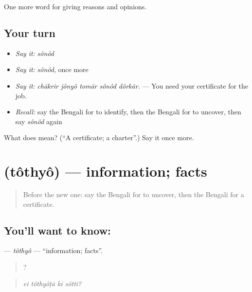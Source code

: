 \begin{grammarlens}[title={What you've built}]
One more word for giving reasons and opinions.
\end{grammarlens}

\subsection*{Your turn}
\begin{itemize}
\raggedright
  \item \emph{Say it:} \emph{sônôd}
  \item \emph{Say it:} \emph{sônôd}, once more
  \item \emph{Say it:} \emph{chākrir jônyô tomār sônôd dôrkār.} — You need your certificate for the job.
  \item \emph{Recall:} say the Bengali for to identify, then the Bengali for to uncover, then say \emph{sônôd} again
\end{itemize}

\begin{tcolorbox}[breakable,colback=teal!4,colframe=teal!35!black,title={Before you move on}]
What does  mean? (\textquotedblleft{}A certificate; a charter\textquotedblright{}.) Say it once more.
\end{tcolorbox}
\section[\texorpdfstring{\bn{তথ্য} (tôthyô)}{তথ্য (tôthyô)}]{ (tôthyô) — information; facts}

\label{lesson:BN-C338-tothyo}



\begin{quote}
Before the new one: say the Bengali for to uncover, then the Bengali for a certificate.
\end{quote}

\subsection*{You'll want to know: }
\textbf{} — \emph{tôthyô} — \textquotedblleft{}information; facts\textquotedblright{}.

\begin{quote}
   ?
\end{quote}

\begin{quote}
\emph{ei tôthyôṭā ki sôtti?}
\end{quote}

